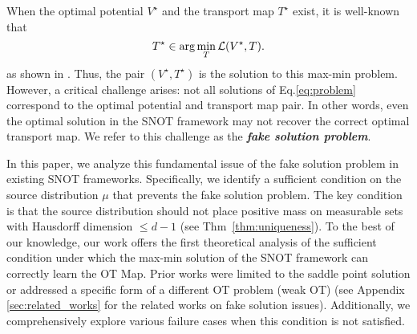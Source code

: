 When the optimal potential $V^\star$ and the transport map $T^\star$ exist, it is well-known that 
\vspace{-5pt}
\begin{equation} \label{eq:optimal_t}
    T^\star \in \arg\min_{T} \mathcal{L}(V^{\star}, T).
    \vspace{-5pt}
\end{equation}
as shown in \citet{otm, fanscalable}. Thus, the pair $(V^\star, T^\star)$ is the solution to this max-min problem. However, a critical challenge arises: not all solutions of Eq.\ref{eq:problem} correspond to the optimal potential and transport map pair. 
In other words, even the optimal solution in the SNOT framework may not recover the correct optimal transport map. We refer to this challenge as the \textit{\textbf{fake solution problem}}.

In this paper, we analyze this fundamental issue of the fake solution problem in existing SNOT frameworks. Specifically, we identify a sufficient condition on the source distribution $\mu$ that prevents the fake solution problem. The key condition is that the source distribution should not place positive mass on measurable sets with Hausdorff dimension $\leq d-1$ (see Thm~\ref{thm:uniqueness}). To the best of our knowledge, our work offers the first theoretical analysis of the sufficient condition under which the max-min solution of the SNOT framework can correctly learn the OT Map. Prior works were limited to the saddle point solution \citep{fanTMLR} or addressed a specific form of a different OT problem (weak OT) \citep{not, knot} (see Appendix \ref{sec:related_works} for the related works on fake solution issues). Additionally, we comprehensively explore various failure cases when this condition is not satisfied. 

